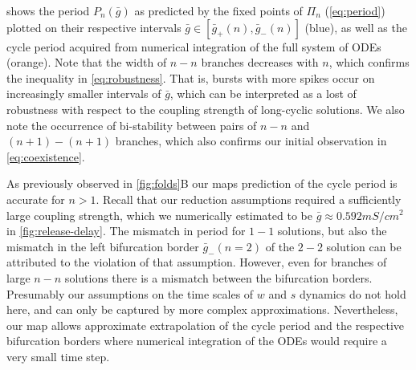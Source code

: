  shows the period \(P_n(\bar g)\) as predicted by the fixed points of \(\Pi_n\) (\cref{eq:period}) plotted on their respective intervals \(\bar g \in [\bar g_+(n),\bar g_-(n)]\) (blue), as well as the cycle period acquired from numerical integration of the full system of ODEs (orange).
Note that the width of \(n-n\) branches decreases with \(n\), which confirms the inequality in \cref{eq:robustness}.
That is, bursts with more spikes occur on increasingly smaller intervals of \(\bar g\), which can be interpreted as a lost of robustness with respect to the coupling strength of long-cyclic solutions.
We also note the occurrence of bi-stability between pairs of \(n-n\) and \((n+1)-(n+1)\) branches, which also confirms our initial observation in
\cref{eq:coexistence}.

As previously observed in \cref{fig:folds}B our maps prediction of the cycle period is accurate for \(n>1\).
Recall that our reduction assumptions required a sufficiently large coupling strength, which we numerically estimated to be \(\bar g \approx 0.592\si{mS/cm^2}\) in \cref{fig:release-delay}.
The mismatch in period for \(1-1\) solutions, but also the mismatch in the left bifurcation border \(\bar g_-(n=2)\) of the \(2-2\) solution can be attributed to the violation of that assumption.
However, even for branches of large \(n-n\) solutions there is a mismatch between the bifurcation borders.
Presumably our assumptions on the time scales of \(w\) and \(s\) dynamics do not hold here, and can only be captured by more complex approximations.
Nevertheless, our map allows approximate extrapolation of the cycle period and the respective bifurcation borders where numerical integration of the ODEs would require a very small time step.

